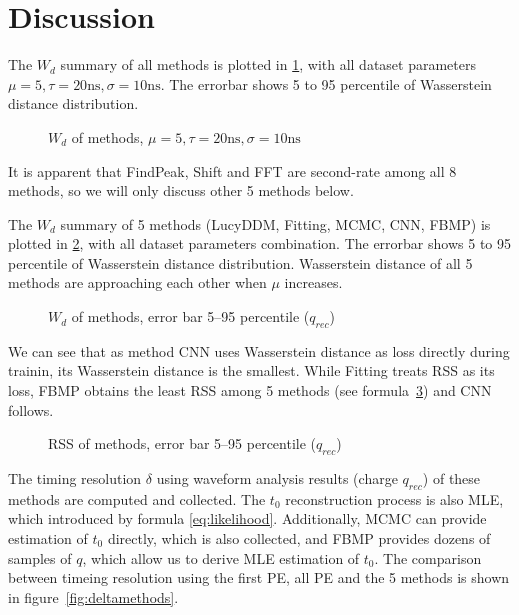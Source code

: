 \section{Discussion} %
\label{sec:discussion}

The $W_{d}$ summary of all methods is plotted in \ref{fig:chargesummary}, with all dataset parameters $\mu=5, \tau=20\mathrm{ns}, \sigma=10\mathrm{ns}$. The errorbar shows 5 to 95 percentile of Wasserstein distance distribution. 

\begin{figure}[H]
    \centering
    \scalebox{0.5}{}
    \caption{\label{fig:chargesummary} $W_{d}$ of methods, $\mu=5, \tau=20\mathrm{ns}, \sigma=10\mathrm{ns}$}
\end{figure}

It is apparent that FindPeak, Shift and FFT are second-rate among all 8 methods, so we will only discuss other 5 methods below. 


The $W_{d}$ summary of 5 methods (LucyDDM, Fitting, MCMC, CNN, FBMP) is plotted in \ref{fig:wdistsummary}, with all dataset parameters combination. The errorbar shows 5 to 95 percentile of Wasserstein distance distribution. Wasserstein distance of all 5 methods are approaching each other when $\mu$ increases. 

\begin{figure}[H]
    \centering
    \resizebox{\textwidth}{!}{}
    \caption{\label{fig:wdistsummary} $W_{d}$ of methods, error bar 5--95 percentile ($q_{rec}$)}
\end{figure}

We can see that as method CNN uses Wasserstein distance as loss directly during trainin, its Wasserstein distance is the smallest. While Fitting treats RSS as its loss, FBMP obtains the least RSS among 5 methods (see formula~\ref{fig:rsssummary}) and CNN follows. 

\begin{figure}[H]
    \centering
    \resizebox{\textwidth}{!}{}
    \caption{\label{fig:rsssummary} RSS of methods, error bar 5--95 percentile ($q_{rec}$)}
\end{figure}

The timing resolution $\delta$ using waveform analysis results (charge $q_{rec}$) of these methods are computed and collected. The $t_{0}$ reconstruction process is also MLE, which introduced by formula \eqref{eq:likelihood}. Additionally, MCMC can provide estimation of $t_{0}$ directly, which is also collected, and FBMP provides dozens of samples of $q$, which allow us to derive MLE estimation of $t_{0}$. The comparison between timeing resolution using the first PE, all PE and the 5 methods is shown in figure~\ref{fig:deltamethods}. 

